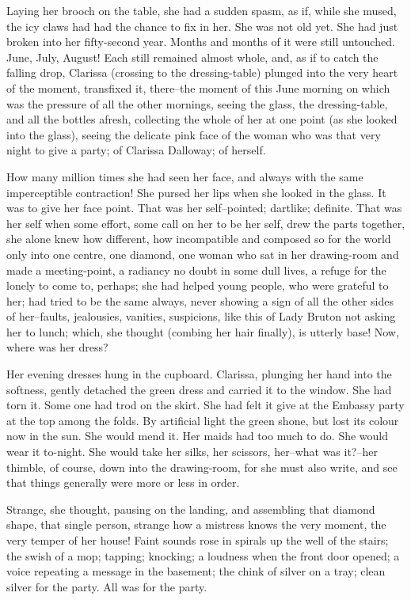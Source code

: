 \documentclass[lang=cn,10pt]{elegantbook}
\begin{document}
Laying her brooch on the table, she had a sudden spasm, as if,
while she mused, the icy claws had had the chance to fix in her.
She was not old yet.  She had just broken into her fifty-second
year.  Months and months of it were still untouched.  June, July,
August!  Each still remained almost whole, and, as if to catch the
falling drop, Clarissa (crossing to the dressing-table) plunged
into the very heart of the moment, transfixed it, there--the moment
of this June morning on which was the pressure of all the other
mornings, seeing the glass, the dressing-table, and all the bottles
afresh, collecting the whole of her at one point (as she looked
into the glass), seeing the delicate pink face of the woman who was
that very night to give a party; of Clarissa Dalloway; of herself.

How many million times she had seen her face, and always with the
same imperceptible contraction!  She pursed her lips when she
looked in the glass.  It was to give her face point.  That was her
self--pointed; dartlike; definite.  That was her self when some
effort, some call on her to be her self, drew the parts together,
she alone knew how different, how incompatible and composed so for
the world only into one centre, one diamond, one woman who sat in
her drawing-room and made a meeting-point, a radiancy no doubt in
some dull lives, a refuge for the lonely to come to, perhaps; she
had helped young people, who were grateful to her; had tried to be
the same always, never showing a sign of all the other sides of
her--faults, jealousies, vanities, suspicions, like this of Lady
Bruton not asking her to lunch; which, she thought (combing her
hair finally), is utterly base!  Now, where was her dress?

Her evening dresses hung in the cupboard.  Clarissa, plunging her
hand into the softness, gently detached the green dress and carried
it to the window.  She had torn it.  Some one had trod on the
skirt.  She had felt it give at the Embassy party at the top among
the folds.  By artificial light the green shone, but lost its
colour now in the sun.  She would mend it.  Her maids had too much
to do.  She would wear it to-night.  She would take her silks, her
scissors, her--what was it?--her thimble, of course, down into the
drawing-room, for she must also write, and see that things
generally were more or less in order.

Strange, she thought, pausing on the landing, and assembling that
diamond shape, that single person, strange how a mistress knows the
very moment, the very temper of her house!  Faint sounds rose in
spirals up the well of the stairs; the swish of a mop; tapping;
knocking; a loudness when the front door opened; a voice repeating
a message in the basement; the chink of silver on a tray; clean
silver for the party.  All was for the party.
\end{document}

